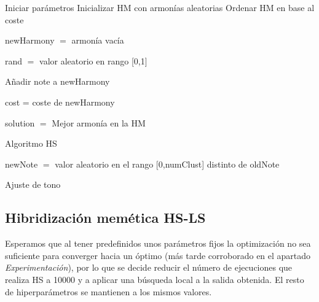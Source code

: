 \begin{algorithm}[H]
    \SetAlgoLined
        Iniciar parámetros \;
        Inicializar HM con armonías aleatorias \;
        Ordenar HM en base al coste \;
         {
            newHarmony $=$ armonía vacía \;
             {
                rand $=$ valor aleatorio en rango [0,1] \;
                

                Añadir note a newHarmony \;
            }
            cost = coste de newHarmony \;
        }
        solution $=$ Mejor armonía en la HM \;
    \caption{Algoritmo HS}
\end{algorithm}

\vspace{\baselineskip}


\begin{algorithm}[H]
    \SetAlgoLined
    newNote $=$ valor aleatorio en el rango [0,numClust] distinto de oldNote\;
    \caption{Ajuste de tono}
\end{algorithm}

\newpage

\subsection{Hibridización memética HS-LS}

Esperamos que al tener predefinidos unos parámetros fijos la optimización no sea suficiente para converger hacia un óptimo (más tarde corroborado en el apartado \textit{Experimentación}), por lo que se decide reducir el número de ejecuciones que realiza HS a 10000 y a aplicar una búsqueda local a la salida obtenida. El resto de hiperparámetros se mantienen a los mismos valores.

